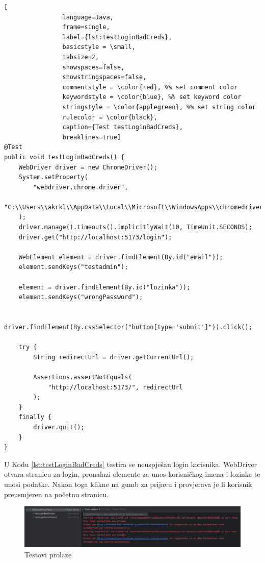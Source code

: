 \begin{lstlisting}[
				language=Java,
				frame=single,
				label={lst:testLoginBadCreds},
				basicstyle = \small,
				tabsize=2,
				showspaces=false,
				showstringspaces=false,
				commentstyle = \color{red}, %% set comment color
				keywordstyle = \color{blue}, %% set keyword color
				stringstyle = \color{applegreen}, %% set string color
				rulecolor = \color{black},
				caption={Test testLoginBadCreds},
				breaklines=true]
@Test
public void testLoginBadCreds() {
	WebDriver driver = new ChromeDriver();
	System.setProperty(
		"webdriver.chrome.driver",
		"C:\\Users\\akrkl\\AppData\\Local\\Microsoft\\WindowsApps\\chromedriver.exe"
	);
	driver.manage().timeouts().implicitlyWait(10, TimeUnit.SECONDS);
	driver.get("http://localhost:5173/login");

	WebElement element = driver.findElement(By.id("email"));
	element.sendKeys("testadmin");

	element = driver.findElement(By.id("lozinka"));
	element.sendKeys("wrongPassword");

	driver.findElement(By.cssSelector("button[type='submit']")).click();

	try {
		String redirectUrl = driver.getCurrentUrl();

		Assertions.assertNotEquals(
			"http://localhost:5173/", redirectUrl
		);
	}
	finally {
		driver.quit();
	}
}
			\end{lstlisting}

U Kodu \ref{lst:testLoginBadCreds} testira se neuspješan login korisnika. WebDriver otvara stranicu za login, pronalazi elemente za unos korisničkog imena i lozinke te unosi podatke. Nakon toga klikne na gumb za prijavu i provjerava je li korisnik preusmjeren na početnu stranicu.

\pagebreak

\begin{figure}[!htb]
	\centering
	\includegraphics[width=\textwidth]{slike/test_passed.png}
	\caption{Testovi prolaze}
\end{figure}

